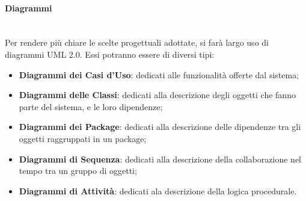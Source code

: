 \paragraph{Diagrammi}\label{Progettazione_Diagrammi}\-\\
Per rendere più chiare le scelte progettuali adottate, si farà largo uso di diagrammi UML 2.0\glossario. Essi potranno essere di diversi tipi:
\begin{itemize}
	\item \textbf{Diagrammi dei Casi d'Uso}: dedicati alle funzionalità offerte dal sistema;
	\item \textbf{Diagrammi delle Classi}: dedicati alla descrizione degli oggetti che fanno parte del sistema, e le loro dipendenze;
	\item \textbf{Diagrammi dei Package}: dedicati alla descrizione delle dipendenze tra gli oggetti raggruppati in un package;
	\item \textbf{Diagrammi di Sequenza}: dedicati alla descrizione della collaborazione nel tempo tra un gruppo di oggetti;
	\item \textbf{Diagrammi di Attività}: dedicati ala descrizione della logica procedurale.
\end{itemize}
